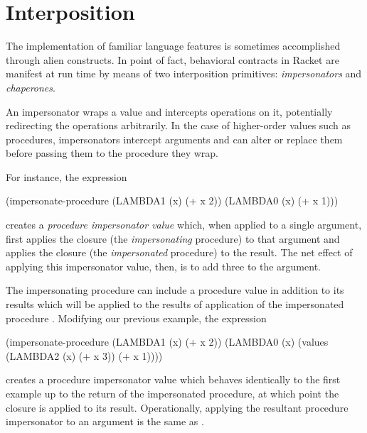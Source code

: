 
\section{Interposition}

The implementation of familiar language features is sometimes accomplished through alien constructs.
In point of fact, behavioral contracts in Racket are manifest at run time by means of two interposition primitives: \emph{impersonators} and \emph{chaperones}.

An impersonator wraps a value and intercepts operations on it, potentially redirecting the operations arbitrarily.
In the case of higher-order values such as procedures, impersonators intercept arguments and can alter or replace them before passing them to the procedure they wrap.

For instance, the expression
\begin{schemedisplay}
(impersonate-procedure (LAMBDA1 (x) (+ x 2)) (LAMBDA0 (x) (+ x 1)))
\end{schemedisplay}
creates a \emph{procedure impersonator value} which, when applied to a single argument, first applies the  closure (the \emph{impersonating} procedure) to that argument and applies the  closure (the \emph{impersonated} procedure) to the result.
The net effect of applying this impersonator value, then, is to add three to the argument.

The impersonating procedure  can include a procedure value in addition to its results which will be applied to the results of application of the impersonated procedure .
Modifying our previous example, the expression
\begin{schemedisplay}
(impersonate-procedure (LAMBDA1 (x) (+ x 2))
                       (LAMBDA0 (x) (values (LAMBDA2 (x) (+ x 3)) (+ x 1))))
\end{schemedisplay}
creates a procedure impersonator value which behaves identically to the first example up to the return of the impersonated procedure, at which point the  closure is applied to its result.
Operationally, applying the resultant procedure impersonator to an argument  is the same as .


